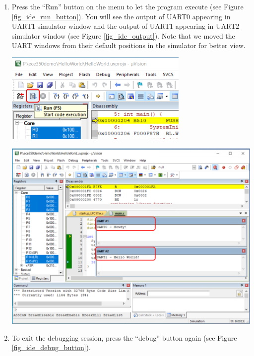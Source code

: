 \begin{enumerate}
      \item Press the ``Run'' button on the menu to let the program execute (see Figure \ref{fig_ide_run_button}). You will see the output of UART0 appearing in UART1 simulator window and the output of UART1 appearing in UART2 simulator window (see Figure \ref{fig_ide_output}). Note that we moved the UART windows from their default positions in the simulator for better view. \par
        \begin{minipage}{\linewidth}
          \centering
          \includegraphics[width=3.5in]{figure/uv5/IDE_run_button}
          \label{fig_ide_run_button}
        \end{minipage}
        \par
        \begin{minipage}{\linewidth}
          \centering
          \includegraphics[width=6in]{figure/uv5/IDE_output}
          \label{fig_ide_output}
        \end{minipage}

      \item To exit the debugging session, press the ``debug'' button again (see Figure \ref{fig_ide_debug_button}).

\end{enumerate}

